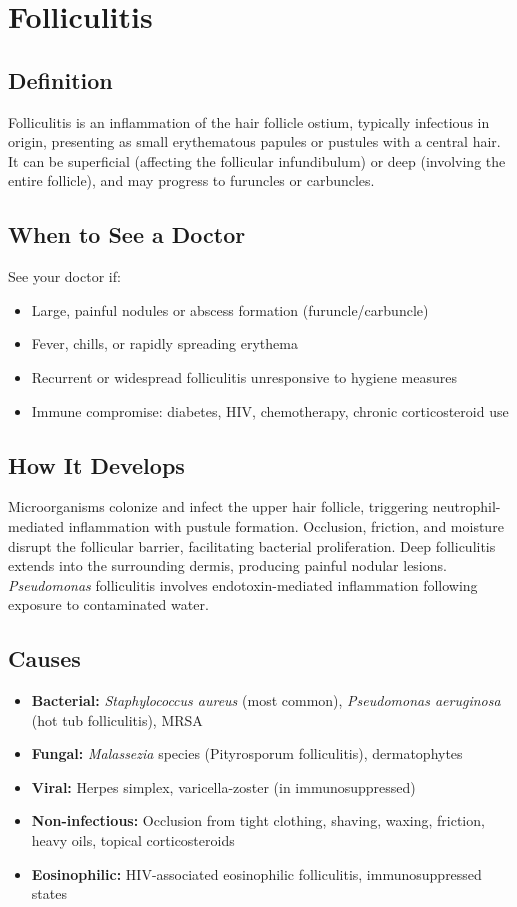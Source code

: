 \chapter{Folliculitis}

\section*{Definition}
Folliculitis is an inflammation of the hair follicle ostium, typically infectious in origin, presenting as small erythematous papules or pustules with a central hair. It can be superficial (affecting the follicular infundibulum) or deep (involving the entire follicle), and may progress to furuncles or carbuncles.

\section*{When to See a Doctor}
See your doctor if:
\begin{itemize}
  \item Large, painful nodules or abscess formation (furuncle/carbuncle)
  \item Fever, chills, or rapidly spreading erythema
  \item Recurrent or widespread folliculitis unresponsive to hygiene measures
  \item Immune compromise: diabetes, HIV, chemotherapy, chronic corticosteroid use
\end{itemize}

\section*{How It Develops}
Microorganisms colonize and infect the upper hair follicle, triggering neutrophil-mediated inflammation with pustule formation. Occlusion, friction, and moisture disrupt the follicular barrier, facilitating bacterial proliferation. Deep folliculitis extends into the surrounding dermis, producing painful nodular lesions. \textit{Pseudomonas} folliculitis involves endotoxin-mediated inflammation following exposure to contaminated water.

\section*{Causes}
\begin{itemize}
  \item \textbf{Bacterial:} \textit{Staphylococcus aureus} (most common), \textit{Pseudomonas aeruginosa} (hot tub folliculitis), MRSA
  \item \textbf{Fungal:} \textit{Malassezia} species (Pityrosporum folliculitis), dermatophytes
  \item \textbf{Viral:} Herpes simplex, varicella-zoster (in immunosuppressed)
  \item \textbf{Non-infectious:} Occlusion from tight clothing, shaving, waxing, friction, heavy oils, topical corticosteroids
  \item \textbf{Eosinophilic:} HIV-associated eosinophilic folliculitis, immunosuppressed states
\end{itemize}

